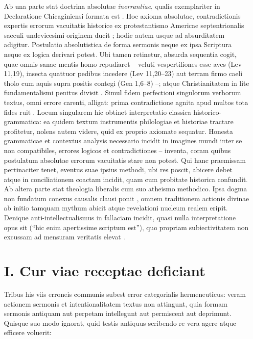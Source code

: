 \documentclass[11pt,a4paper]{article}
\begin{document}
Ab una parte stat doctrina absolutae \textit{inerrantiae}, qualis exemplariter in Declaratione Chicaginiensi formata est \citep{icbi1978}. Hoc axioma absolutae, contradictionis expertis errorum vacuitatis historice ex protestantismo Americae septentrionalis saeculi undevicesimi originem ducit \citep{rogersmckim1979}; hodie autem usque ad absurditatem adigitur. Postulatio absolutistica de forma sermonis neque ex ipsa Scriptura neque ex logica derivari potest. Ubi tamen retinetur, absurda sequentia cogit, quae omnis sanae mentis homo repudiaret -- veluti vespertiliones esse aves (Lev 11,19), insecta quattuor pedibus incedere (Lev 11,20--23) aut terram firmo caeli tholo cum aquis supra positis contegi (Gen 1,6--8) \citep{wells2013} --; atque Christianitatem in lite fundamentalismi penitus divisit \citep{marsden2006}. Simul fidem perfectioni singulorum verborum textus, omni errore carenti, alligat: prima contradictione agnita apud multos tota fides ruit \citep{ehrman2009}. Locum singularem hic obtinet interpretatio classica historico-grammatica: ea quidem textum instrumentis philologiae et historiae tractare profitetur, nolens autem videre, quid ex proprio axiomate sequatur. Honesta grammaticae et contextus analysis necessario incidit in imagines mundi inter se non compatibiles, errores logicos et contradictiones -- inventa, coram quibus postulatum absolutae errorum vacuitatis stare non potest. Qui hanc praemissam pertinaciter tenet, eventus suae ipsius methodi, ubi res poscit, abicere debet atque in conciliationem coactam incidit, quam cum probitate historica confundit. Ab altera parte stat theologia liberalis cum suo atheismo methodico. Ipsa dogma non fundatum conexus causalis clausi ponit \citep{troeltsch1913,schlatter1905}, omnem traditionem actionis divinae ab initio tamquam mythum abicit \citep{bultmann1941} atque revelationi nucleum realem eripit. Denique anti-intellectualismus in fallaciam incidit, quasi nulla interpretatione opus sit (``hic enim apertissime scriptum est''), quo propriam subiectivitatem non excussam ad mensuram veritatis elevat \citep{noll1994}.

\section*{I. Cur viae receptae deficiant}

Tribus his viis erroneis communis subest error categorialis hermeneuticus: veram actionem sermonis et intentionalitatem textus non attingunt, quia formam sermonis antiquam aut perpetam intellegunt aut permiscent aut deprimunt. Quisque suo modo ignorat, quid testis antiquus scribendo re vera agere atque efficere voluerit:
\end{document}
